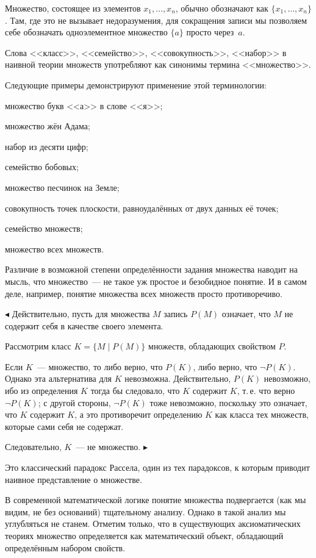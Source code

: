 Множество, состоящее из элементов $x_1, \ldots, x_n$, обычно обозначают как $\{x_1, \ldots, x_n\}$. Там, где это не вызывает недоразумения, для сокращения записи мы позволяем себе обозначать одноэлементное множество $\{a\}$ просто через~$a$.

Слова <<класс>>, <<семейство>>, <<совокупность>>, <<набор>> в наивной теории множеств употребляют как синонимы термина <<множество>>.

Следующие примеры демонстрируют применение этой терминологии:

множество букв <<а>> в слове <<я>>;

множество жён Адама;

набор из десяти цифр;

семейство бобовых;

множество песчинок на Земле;

совокупность точек плоскости, равноудалённых от двух данных её точек;

семейство множеств;

множество всех множеств.

Различие в возможной степени определённости задания множества наводит на мысль, что множество~--- не такое уж простое и безобидное понятие. И в самом деле, например, понятие множества всех множеств просто противоречиво.

$\blacktriangleleft$ Действительно, пусть для множества $M$ запись $P(M)$ означает, что $M$ не содержит себя в качестве своего элемента.

Рассмотрим класс $K = \{M \mid P(M)\}$ множеств, обладающих свойством $P$.

Если $K$~--- множество, то либо верно, что $P(K)$, либо верно, что $\neg P(K)$. Однако эта альтернатива для $K$ невозможна. Действительно, $P(K)$ невозможно, ибо из определения $K$ тогда бы следовало, что $K$ содержит $K$, т.\,е. что верно $\neg P(K)$; с другой стороны, $\neg P(K)$ тоже невозможно, поскольку это означает, что $K$ содержит $K$, а это противоречит определению $K$ как класса тех множеств, которые сами себя не содержат.

Следовательно, $K$~--- не множество. $\blacktriangleright$

Это классический парадокс Рассела\footnotemark[1], один из тех парадоксов, к которым приводит наивное представление о множестве.


В современной математической логике понятие множества подвергается (как мы видим, не без оснований) тщательному анализу. Однако в такой анализ мы углубляться не станем. Отметим только, что в существующих аксиоматических теориях множество определяется как математический объект, обладающий определённым набором свойств.

